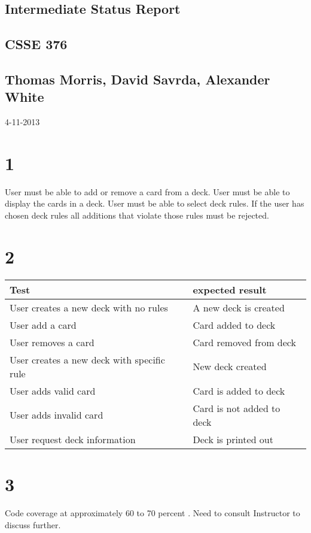 \documentclass{article}
\begin{document}
	\begin{titlepage}
		\vspace*{\fill}
		\hrulefill
		\begin{center}
			\section*{Intermediate Status Report}
			\subsection*{CSSE 376}
			\subsection*{Thomas Morris, David Savrda, Alexander White}
			4-11-2013
		\end{center}
		\hrulefill
		\vspace*{\fill}
	\end{titlepage}
	\newpage
	\section*{1}
		User must be able to add or remove a card from a deck. User must be able to display the cards in a deck. User must be able to select deck rules. If the user has chosen deck rules all additions that violate those rules must be rejected.
	\section*{2}
		\begin{tabular}{| l | l |} \hline
			Test & expected result \\ \hline
			User creates a new deck with no rules & A new deck is created \\ \hline
			User add a card & Card added to deck \\ \hline
			User removes a card & Card removed from deck \\ \hline
			User creates a new deck with specific rule& New deck created \\ \hline
			User adds valid card & Card is added to deck \\ \hline
			User adds invalid card & Card is not added to deck \\ \hline
			User request deck information & Deck is printed out \\ \hline
		\end{tabular}
	\section*{3}
		Code coverage at approximately 60 to 70 percent . Need to consult Instructor to discuss further.
	
	
\end{document}
